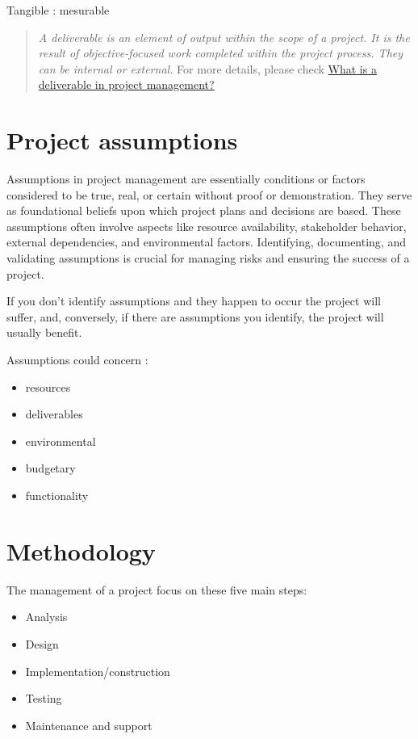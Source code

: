\documentclass{article}
\begin{document}
Tangible : mesurable


\begin{quote}
\textit{A deliverable is an element of output within the scope of a project. It is the result of objective-focused work completed within the project process. They can be internal or external.}\newline
For more details, please check \href{https://www.wrike.com/project-management-guide/faq/what-is-a-deliverable-in-project-management/}{What is a deliverable in project management?}
\end{quote}

\newpage
\section{Project assumptions}
Assumptions in project management are essentially conditions or factors considered to be true, real, or certain without proof or demonstration. They serve as foundational beliefs upon which project plans and decisions are based. These assumptions often involve aspects like resource availability, stakeholder behavior, external dependencies, and environmental factors. Identifying, documenting, and validating assumptions is crucial for managing risks and ensuring the success of a project.

If you don’t identify assumptions and they happen to occur  the project will suffer, and, conversely, if there are assumptions you identify, the project will usually benefit.

Assumptions could concern :
\begin{itemize}
	\item resources
	\item deliverables
	\item environmental
	\item budgetary
	\item functionality
\end{itemize}

\newpage
\section{Methodology}
The management of a project focus on these five main steps:
\begin{itemize}
	\item Analysis
	\item Design
	\item Implementation/construction
	\item Testing
	\item Maintenance and support 
\end{itemize}
\end{document}
